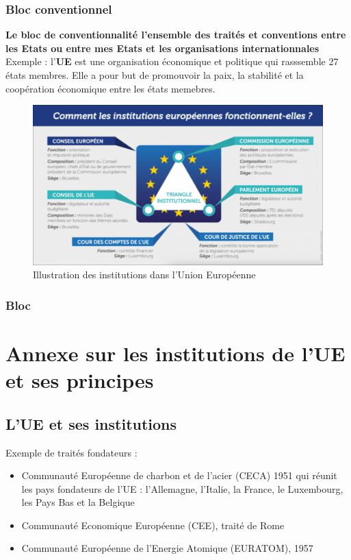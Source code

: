 \subsection{Bloc conventionnel}
\textbf{Le bloc de conventionnalité l'ensemble des traités et conventions entre les Etats ou entre mes Etats et les organisations internationnales} \newline
Exemple : l'\textbf{UE} est une organisation économique et politique qui rasssemble 27 états membres. Elle a pour but de promouvoir la paix, la stabilité et la coopération économique entre les états memebres. \newline
\begin{center}
    \begin{figure}[hbt!]
        \includegraphics[scale=0.3]{Pics/Institutions_UE.png}
        \caption{Illustration des institutions dans l'Union Européenne}
    \end{figure}
\end{center}
\newpage
\subsection{Bloc}
\newpage
\chapter{Annexe sur les institutions de l'UE et ses principes}
\newpage
\section{L'UE et ses institutions}
Exemple de traités fondateurs :
\begin{itemize}
    \item Communauté Européenne de charbon et de l'acier (CECA) 1951 qui réunit les pays fondateurs de l'UE : l'Allemagne, l'Italie, la France, le Luxembourg, les Pays Bas et la Belgique
    \item Communauté Economique Européenne (CEE), traité de Rome 
    \item Communauté Européenne de l'Energie Atomique (EURATOM), 1957 \newline
\end{itemize}

